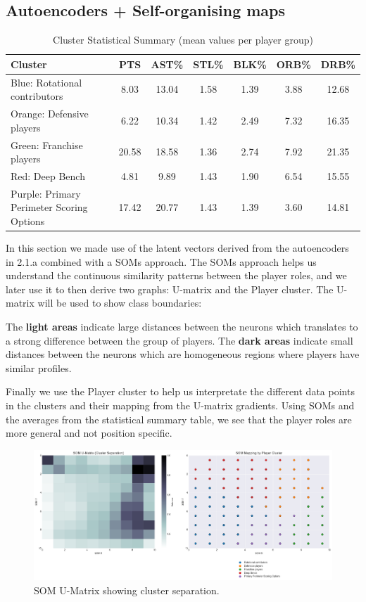\documentclass{article}
\begin{document}
\subsection{Autoencoders + Self-organising maps}

\begin{table}[h!]
\centering
\caption{Cluster Statistical Summary (mean values per player group)}
\label{tab:cluster_stats}
\begin{tabular}{lcccccc}
\toprule
\textbf{Cluster} & \textbf{PTS} & \textbf{AST\%} & \textbf{STL\%} & \textbf{BLK\%} & \textbf{ORB\%} & \textbf{DRB\%} \\
\midrule
Blue: Rotational contributors & 8.03 & 13.04 & 1.58 & 1.39 & 3.88 &	12.68 \\
Orange: Defensive players & 6.22 & 10.34 & 1.42 & 2.49 & 7.32 & 16.35 \\
Green: Franchise players & 20.58 & 18.58 & 1.36 & 2.74 & 7.92 & 21.35 \\
Red: Deep Bench & 4.81	& 9.89 &	1.43 &	1.90 &	6.54 &	15.55 \\
Purple: Primary Perimeter Scoring Options & 17.42	&20.77 &	1.43 &	1.39	& 3.60	& 14.81 \\
\bottomrule
\end{tabular}
\end{table}

In this section we made use of the latent vectors derived from the autoencoders in 2.1.a combined with a SOMs approach.
The SOMs approach helps us understand the continuous similarity patterns between the player roles, and we later use it to then derive two graphs: U-matrix and the Player cluster. The U-matrix will be used to show class boundaries:

The {\bf light areas} indicate large distances between the neurons which translates to a strong difference between the group of players.
The {\bf dark areas} indicate small distances between the neurons which are homogeneous regions where players have similar profiles.

Finally we use the Player cluster to help us interpretate the different data points in the clusters and their mapping from the U-matrix gradients. Using SOMs and the averages from the statistical summary table, we see that the player roles are more general and not position specific.

\begin{figure}[h]
    \centering
    \includegraphics[width=0.7\linewidth]{media/2b.png}
    \caption{SOM U-Matrix showing cluster separation.}
\end{figure}
\end{document}

